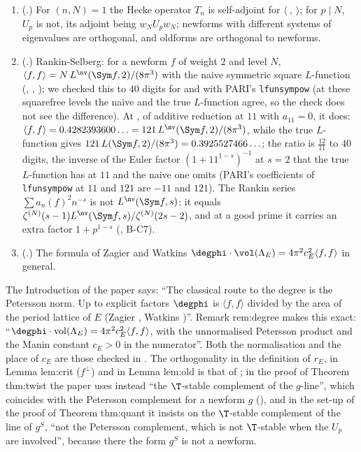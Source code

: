 \begin{remark}\label{rem:modforms:petersson-forward}
\begin{enumerate}[label=(\alph*)]
\item (.) For $(n,N)=1$ the Hecke operator $T_n$ is self-adjoint for $\langle\ ,\ \rangle$; for $p\mid N$, $U_p$ is not, its adjoint being $w_NU_pw_N$; newforms with different
systems of eigenvalues are orthogonal, and oldforms are orthogonal to newforms.
\item (.) Rankin-Selberg: for a newform $f$ of weight $2$ and level $N$, $\langle f,f\rangle=N\,L^{\nv}(\Sym f,2)/(8\pi^3)$ with the naive symmetric square
$L$-function (\cite[Lemma 2.12]{DFG04}, \cite{Shimura76}, \cite{Rankin39}); we checked this to $40$ digits for  and  with PARI's \texttt{lfunsympow} (at these squarefree levels the naive and the true $L$-function agree, so the check does not see the difference).
At , of additive reduction at $11$ with $a_{11}=0$, it does: $\langle f,f\rangle=0.4282393600\ldots=121\,L^{\nv}(\Sym f,2)/(8\pi^3)$, while the true $L$-function gives
$121\,L(\Sym f,2)/(8\pi^3)=0.3925527466\ldots$; the ratio is $\frac{12}{11}$ to $40$ digits, the inverse of the Euler factor $(1+11^{1-s})^{-1}$ at $s=2$ that the true $L$-function has at $11$ and
the naive one omits (PARI's coefficients of \texttt{lfunsympow} at $11$ and $121$ are $-11$ and $121$). The Rankin
series $\sum a_n(f)^2n^{-s}$ is not $L^{\nv}(\Sym f,s)$: it equals $\zeta^{(N)}(s-1)L^{\nv}(\Sym f,s)/\zeta^{(N)}(2s-2)$, and at a good prime it carries an extra factor $1+p^{1-s}$
(, B-C7).
\item (.) The formula of Zagier and Watkins $\degphi\cdot\vol(\Lambda_E)=4\pi^2c_E^2\langle f,f\rangle$ in general.
\end{enumerate}
\end{remark}

\begin{paperlink}\label{pl:modforms:petersson}
The Introduction of the paper says: ``The classical route to the degree is the Petersson norm. Up to explicit factors $\degphi$ is $\langle f,f\rangle$ divided by the area of the
period lattice of $E$ (Zagier \cite{Zagier85}, Watkins \cite{Watkins02})''. Remark rem:degree makes this exact: ``$\degphi\cdot\operatorname{vol}(\Lambda_E)=4\pi^2c_E^2\langle f,f\rangle$, with the
unnormalised Petersson product and the Manin constant $c_E>0$ in the numerator''. Both the normalisation and the place of $c_E$ are those checked in
. The orthogonality in the definition of $r_E$, in Lemma lem:crit ($f^\perp$) and in Lemma lem:old is that of
; in the proof of Theorem thm:twist the paper uses instead ``the $\T$-stable complement of the $g$-line'', which coincides with the Petersson
complement for a newform $g$ (), and in the set-up of the proof of Theorem thm:quant it insists on the $\T$-stable complement of the line of $g^S$, ``not the Petersson complement, which is not
$\T$-stable when the $U_p$ are involved'', because there the form $g^S$ is not a newform.
\end{paperlink}

